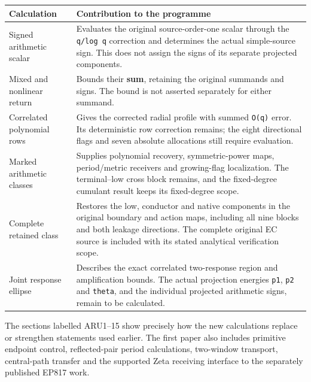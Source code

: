 \documentclass[
]{article}
\newcounter{none} %
\begin{document}
{\def\LTcaptype{none} %
\begin{longtable}[]{@{}
  >{\raggedright\arraybackslash}p{}
  >{\raggedright\arraybackslash}p{}@{}}
\toprule\noalign{}
\begin{minipage}[b]{\linewidth}\raggedright
Calculation
\end{minipage} & \begin{minipage}[b]{\linewidth}\raggedright
Contribution to the programme
\end{minipage} \\
\midrule\noalign{}
\endhead
\bottomrule\noalign{}
\endlastfoot
Signed arithmetic scalar & Evaluates the original source-order-one
scalar through the \texttt{q/log\ q} correction and determines the
actual simple-source sign. This does not assign the signs of its
separate projected components. \\
Mixed and nonlinear return & Bounds their \textbf{sum}, retaining the
original summands and signs. The bound is not asserted separately for
either summand. \\
Correlated polynomial rows & Gives the corrected radial profile with
summed \texttt{O(q)} error. Its deterministic row correction remains;
the eight directional flags and seven absolute allocations still require
evaluation. \\
Marked arithmetic classes & Supplies polynomial recovery,
symmetric-power maps, period/metric receivers and growing-flag
localization. The terminal--low cross block remains, and the
fixed-degree cumulant result keeps its fixed-degree scope. \\
Complete retained class & Restores the low, conductor and native
components in the original boundary and action maps, including all nine
blocks and both leakage directions. The complete original EC source is
included with its stated analytical verification scope. \\
Joint response ellipse & Describes the exact correlated two-response
region and amplification bounds. The actual projection energies
\texttt{p1}, \texttt{p2} and \texttt{theta}, and the individual
projected arithmetic signs, remain to be calculated. \\
\end{longtable}
}

The sections labelled ARU1--15 show precisely how the new calculations
replace or strengthen statements used earlier. The first paper also
includes primitive endpoint control, reflected-pair period calculations,
two-window transport, central-path transfer and the supported Zeta
receiving interface to the separately published EP817 work.
\end{document}
